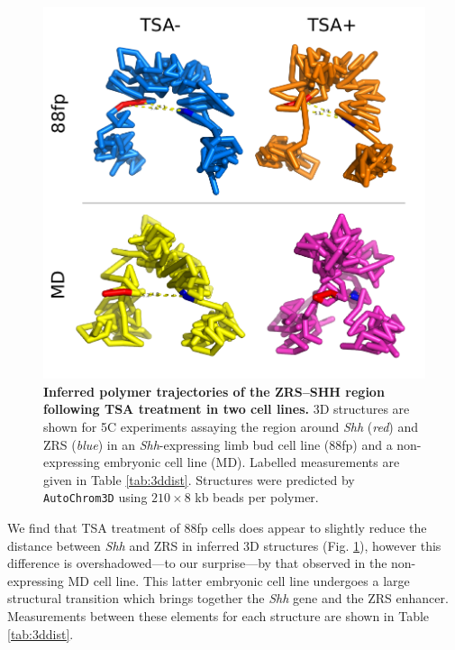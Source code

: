 \documentclass[a4paper,11pt,oneside]{book}
\begin{document}
\begin{figure}
\begin{center} 
\includegraphics[width=5.45in]{figs/5c3d.pdf}
\captionsetup{width=\textwidth} 
\caption[ Inferred polymer trajectories of the ZRS--SHH region following TSA treatment in two cell lines. ]{ {\bf Inferred polymer trajectories of the ZRS--SHH region following TSA treatment in two cell lines. }
3D structures are shown for 5C experiments assaying the region around \emph{Shh} (\emph{red}) and ZRS (\emph{blue}) in an \emph{Shh}-expressing limb bud cell line (88fp) and a non-expressing embryonic cell line (MD). Labelled measurements are given in Table \ref{tab:3ddist}. Structures were predicted by \texttt{AutoChrom3D}\cite{Peng2013} using $210 \times 8$ kb beads per polymer.
}\label{fig:5c3d}
\end{center} 
\end{figure} 

We find that TSA treatment of 88fp cells does appear to slightly reduce the distance between \emph{Shh} and ZRS in inferred 3D structures (Fig. \ref{fig:5c3d}), however this difference is overshadowed---to our surprise---by that observed in the non-expressing MD cell line. This latter embryonic cell line undergoes a large structural transition which brings together the \emph{Shh} gene and the ZRS enhancer. Measurements between these elements for each structure are shown in Table \ref{tab:3ddist}.
\end{document}
